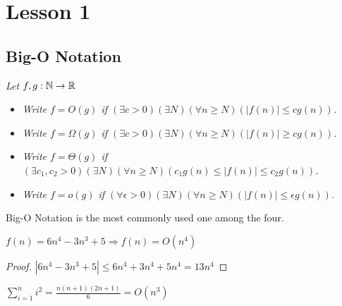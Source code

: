 \documentclass{article}
\begin{document}
\else
\fi
\newpage
\section{Lesson 1}
\subsection{Big-O Notation}

\begin{defn}
    \textit{Let $f,g:\mathbb{N} \rightarrow \mathbb{R}$}
    \begin{itemize}
        \item \textit{Write $f = O(g)$ if $(\exists c > 0)(\exists N)(\forall n \geq N)(|f(n)| \leq cg(n))$.}
        \item \textit{Write $f = \Omega(g)$ if $(\exists c > 0)(\exists N)(\forall n \geq N)(|f(n)| \geq cg(n))$.}
        \item \textit{Write $f = \Theta(g)$ if $(\exists c_1, c_2 > 0)(\exists N)(\forall n \geq N)(c_1g(n) \leq |f(n)| \leq c_2g(n))$.}
        \item \textit{Write $f = o(g)$ if $(\forall \epsilon > 0)(\exists N)(\forall n \geq N)(|f(n)| \leq \epsilon g(n))$.}
    \end{itemize}

    Big-O Notation is the most commonly used one among the four.
\end{defn}


\begin{example}
    $f(n) = 6n^4-3n^3+5 \Rightarrow f(n) = O(n^4)$
\end{example}

\begin{proof}
    $|6n^4-3n^3+5|\leq 6n^4+3n^4+5n^4=13n^4$
\end{proof}


\begin{example}
    $\sum\limits_{i=1}^{n} i^2=\frac{n(n+1)(2n+1)}{6} = O(n^3)$
\end{example}
  
\end{document}
